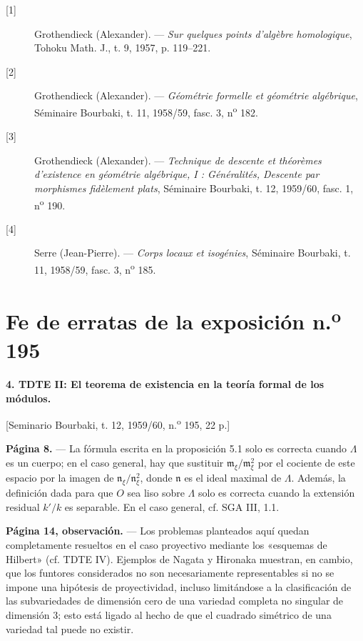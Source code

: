 \documentclass[11pt,twoside,openany]{book}
\numberwithin{equation}{section}
\newcommand{\src}[1]{%
  \phantomsection\hypertarget{src:#1}{}%
  \marginpar{\raggedleft\footnotesize\sffamily #1}%
}
\theoremstyle{plain}
\theoremstyle{definition}
\theoremstyle{remark}
\newcommand{\FgaUnitKey}{frontmatter}
\renewcommand{\src}[1]{%
  \phantomsection\hypertarget{src:\FgaUnitKey:#1}{}%
  \marginpar{\raggedleft\footnotesize\sffamily #1}%
}
\theoremstyle{plain}
\theoremstyle{definition}
\theoremstyle{remark}
\begin{document}
\begin{description}
  \item[{[1]}] Grothendieck (Alexander). --- \emph{Sur quelques points
    d'algèbre homologique}, Tohoku Math. J., t. 9, 1957, p. 119--221.
  \item[{[2]}] Grothendieck (Alexander). --- \emph{Géométrie formelle et
    géométrie algébrique}, Séminaire Bourbaki, t. 11, 1958/59, fasc. 3,
    n\textsuperscript{o} 182.
  \item[{[3]}] Grothendieck (Alexander). --- \emph{Technique de descente et
    théorèmes d'existence en géométrie algébrique, I : Généralités, Descente
    par morphismes fidèlement plats}, Séminaire Bourbaki, t. 12, 1959/60,
    fasc. 1, n\textsuperscript{o} 190.
  \item[{[4]}] Serre (Jean-Pierre). --- \emph{Corps locaux et isogénies},
    Séminaire Bourbaki, t. 11, 1958/59, fasc. 3, n\textsuperscript{o} 185.
\end{description}

\def\FgaUnitKey{e195}\clearpage
\chapter*{Fe de erratas de la exposición n.\textsuperscript{o} 195}
\setcounter{footnote}{0}
\src{300}

\noindent\textbf{4. TDTE II: El teorema de existencia en la teoría formal de
los módulos.}

\begin{center}
[Seminario Bourbaki, t. 12, 1959/60, n.\textsuperscript{o} 195, 22 p.]
\end{center}

\noindent\textbf{Página 8.} --- La fórmula escrita en la proposición 5.1 solo es
correcta cuando $\Lambda$ es un cuerpo; en el caso general, hay que sustituir
$\mathfrak m_\xi/\mathfrak m_\xi^2$ por el cociente de este espacio por la
imagen de $\mathfrak n_\xi/\mathfrak n_\xi^2$, donde $\mathfrak n$ es el ideal
maximal de $\Lambda$. Además, la definición dada para que $O$ sea liso sobre
$\Lambda$ solo es correcta cuando la extensión residual $k'/k$ es separable.
En el caso general, cf. SGA III, 1.1.

\noindent\textbf{Página 14, observación.} --- Los problemas planteados aquí
quedan completamente resueltos en el caso proyectivo mediante los «esquemas de
Hilbert» (cf. TDTE IV). Ejemplos de Nagata y Hironaka muestran, en cambio, que
los funtores considerados no son necesariamente representables si no se impone
una hipótesis de proyectividad, incluso limitándose a la clasificación de las
subvariedades de dimensión cero de una variedad completa no singular de
dimensión 3; esto está ligado al hecho de que el cuadrado simétrico de una
variedad tal puede no existir.
\end{document}
